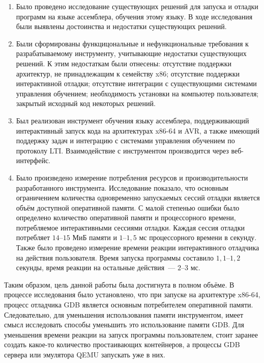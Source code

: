 \documentclass[a4paper,article,14pt]{extarticle}
\begin{document}
\begin{enumerate}
    \item Было проведено исследование существующих решений для запуска и отладки программ на языке ассемблера, обучения этому языку. В ходе исследования были выявлены достоинства и недостатки существующих решений.
    \item Были сформированы функцицональные и нефункциональные требования к разрабатываемому инструменту, учитывающие недостатки существующих решений. К этим недостаткам были отнесены: отсутствие поддержки архитектур, не принадлежащим к семейству x86; отсутствие поддержки интерактивной отладки; отсутствие интеграции с существующими системами управления обучением; необходимость установки на компьютер пользователя; закрытый исходный код некоторых решений.
    \item Был реализован инструмент обучения языку ассемблера, поддерживающий интерактивный запуск кода на архитектурах x86-64 и AVR, а также имеющий поддержку задач и интеграцию с системами управления обучением по протоколу LTI. Взаимодействие с инструментом производится через веб-интерфейс.
    \item Было произведено измерение потребления ресурсов и производительности разработанного инструмента. Исследование показало, что основным ограничением количества одновременно запускаемых сессий отладки является объём доступной оперативной памяти. С малой степенью ошибки было определено количество оперативной памяти и процессорного времени, потребляемое интерактивными сессиями отладки. Каждая сессия отладки потребляет $14$--$15$ МиБ памяти и $1$--$1{,}5$ мс процессорного времени в секунду. Также было проведено измерение времени реакции интерактивного отладчика на действия пользователя. Время запуска программы составило $1{,}1$--$1{,}2$ секунды, время реакции на остальные действия~--- $2$--$3$ мс.
\end{enumerate}

Таким образом, цель данной работы была достигнута в полном объёме. В процессе исследования было установлено, что при запуске на архитектуре x86-64, процесс отладчика GDB является основным потребителем оперативной памяти. Следовательно, для уменьшения использования памяти инструментом, имеет смысл исследовать способы уменьшить это использование памяти GDB. Для уменьшения времени реакции на запуск программы пользователем, стоит заранее создать какое-то количество простаивающих контейнеров, а процессы GDB сервера или эмулятора QEMU запускать уже в них.

\pagebreak
\begin{thebibliography}{1}
\printbibliography[heading=none]
\end{thebibliography}
\end{document}
